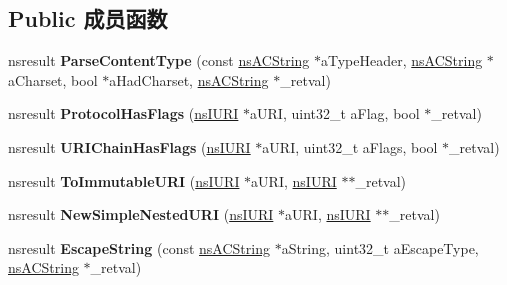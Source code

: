 \subsection*{Public 成员函数}
\begin{DoxyCompactItemize}
\item 
\mbox{\label{interfacens_i_net_util_a205f0d746da603fe4fefd2adc4eddbdd}} 
nsresult {\bfseries Parse\+Content\+Type} (const \hyperlink{structns_c_string_container}{ns\+A\+C\+String} $\ast$a\+Type\+Header, \hyperlink{structns_c_string_container}{ns\+A\+C\+String} $\ast$a\+Charset, bool $\ast$a\+Had\+Charset, \hyperlink{structns_c_string_container}{ns\+A\+C\+String} $\ast$\+\_\+retval)
\item 
\mbox{\label{interfacens_i_net_util_a51cc479a5fb9991e774f979730d8323a}} 
nsresult {\bfseries Protocol\+Has\+Flags} (\hyperlink{interfacens_i_u_r_i}{ns\+I\+U\+RI} $\ast$a\+U\+RI, uint32\+\_\+t a\+Flag, bool $\ast$\+\_\+retval)
\item 
\mbox{\label{interfacens_i_net_util_a7d9c6e2d948bb0d3dedcabfa964c1d7e}} 
nsresult {\bfseries U\+R\+I\+Chain\+Has\+Flags} (\hyperlink{interfacens_i_u_r_i}{ns\+I\+U\+RI} $\ast$a\+U\+RI, uint32\+\_\+t a\+Flags, bool $\ast$\+\_\+retval)
\item 
\mbox{\label{interfacens_i_net_util_a30857ef175a1a07c352a18c945cf30ae}} 
nsresult {\bfseries To\+Immutable\+U\+RI} (\hyperlink{interfacens_i_u_r_i}{ns\+I\+U\+RI} $\ast$a\+U\+RI, \hyperlink{interfacens_i_u_r_i}{ns\+I\+U\+RI} $\ast$$\ast$\+\_\+retval)
\item 
\mbox{\label{interfacens_i_net_util_aa35e921a1a1935e827ee6d8056ad6457}} 
nsresult {\bfseries New\+Simple\+Nested\+U\+RI} (\hyperlink{interfacens_i_u_r_i}{ns\+I\+U\+RI} $\ast$a\+U\+RI, \hyperlink{interfacens_i_u_r_i}{ns\+I\+U\+RI} $\ast$$\ast$\+\_\+retval)
\item 
\mbox{\label{interfacens_i_net_util_acdca4f23e8a7d9303a749c1ad5776c61}} 
nsresult {\bfseries Escape\+String} (const \hyperlink{structns_c_string_container}{ns\+A\+C\+String} $\ast$a\+String, uint32\+\_\+t a\+Escape\+Type, \hyperlink{structns_c_string_container}{ns\+A\+C\+String} $\ast$\+\_\+retval)

\end{DoxyCompactItemize}
